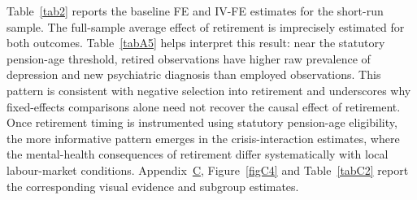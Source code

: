 \documentclass[arguments, manuscript, 11pt]{aastex631}
\begin{document}
\FloatBarrier

Table~\ref{tab2} reports the baseline FE and IV-FE estimates for the short-run sample. The full-sample average effect of retirement is imprecisely estimated for both outcomes. Table~\ref{tabA5} helps interpret this result: near the statutory pension-age threshold, retired observations have higher raw prevalence of depression and new psychiatric diagnosis than employed observations. This pattern is consistent with negative selection into retirement and underscores why fixed-effects comparisons alone need not recover the causal effect of retirement. Once retirement timing is instrumented using statutory pension-age eligibility, the more informative pattern emerges in the crisis-interaction estimates, where the mental-health consequences of retirement differ systematically with local labour-market conditions. Appendix~\hyperref[sec:appendixC]{C}, Figure~\ref{figC4} and Table~\ref{tabC2} report the corresponding visual evidence and subgroup estimates.
\end{document}
